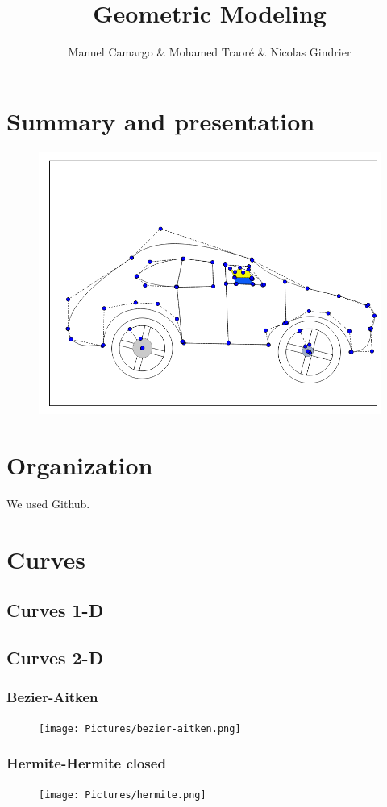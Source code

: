\documentclass{article}
\title{Geometric Modeling}
\author{Manuel Camargo & Mohamed Traoré &  Nicolas Gindrier}
\date{}
\begin{document}
\maketitle
\section*{Summary and presentation}
\begin{figure}[H]
   \includegraphics[scale = 0.5]{Pictures/narutovoiture.png}
\end{figure}
\section*{Organization}
We used Github.
\section*{Curves}
\subsection*{Curves 1-D}
\subsection*{Curves 2-D}
\subsubsection*{Bezier-Aitken}
\begin{figure}[H]
   \texttt{[image: Pictures/bezier-aitken.png]}
\end{figure}
\subsubsection*{Hermite-Hermite closed}
\begin{figure}[H]
   \texttt{[image: Pictures/hermite.png]}
\end{figure}
\end{document}
